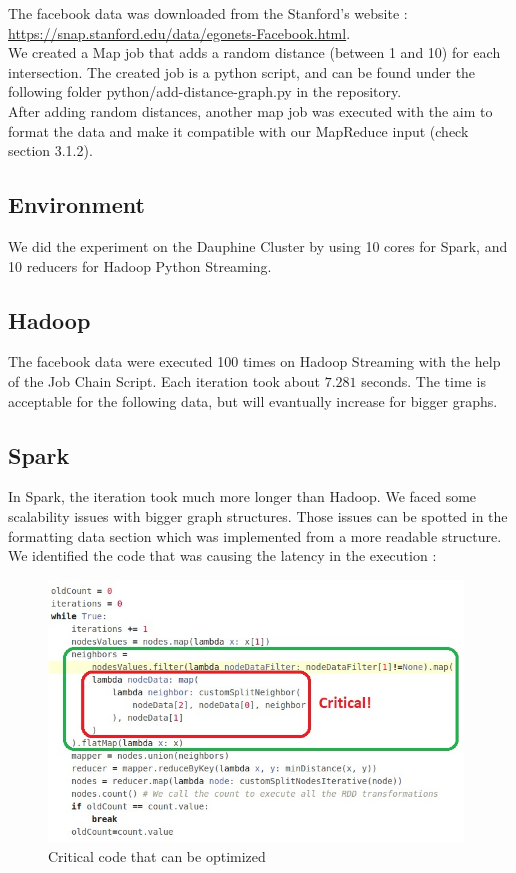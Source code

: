 \documentclass[english]{article}
\begin{document}
The facebook data was downloaded from the Stanford's website :\\  \href{https://snap.stanford.edu/data/egonets-Facebook.html}{https://snap.stanford.edu/data/egonets-Facebook.html}.\\

We created a Map job that adds a random distance (between 1 and 10) for each intersection. The created job is a python script, and can be found under the following folder python/add-distance-graph.py in the repository. \\

After adding random distances, another map job was executed with the aim to format the data and make it compatible with our MapReduce input (check section 3.1.2).
 
\subsection{Environment}
We did the experiment on the Dauphine Cluster by using 10 cores for Spark, and 10 reducers for Hadoop Python Streaming.

\subsection{Hadoop}
The facebook data were executed 100 times on Hadoop Streaming with the help of the Job Chain Script. Each iteration took about $7.281$ seconds. The time is acceptable for the following data, but will evantually increase for bigger graphs.\\

\newpage
\subsection{Spark}
In Spark, the iteration took much more longer than Hadoop.
We faced some scalability issues with bigger graph structures. Those issues can be spotted in the formatting data section which was implemented from a more readable structure. We identified the code that was causing the latency in the execution :\\

\begin{figure}[h]
\centering
\includegraphics[width=11cm]{img/critical.jpeg}
\caption{Critical code that can be optimized}
\end{figure}
\end{document}
